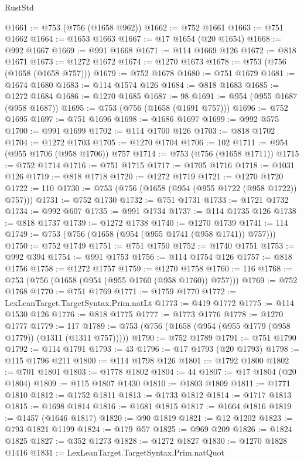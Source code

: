 \begin{lexlean}{RustStd}
\begin{coremodule}
{\begin{coremodule}
{{{{{{{{{{{{{{{{{{{{{{{{{{{{{{{{{{{{{{{{{{{{{{{{{{@1661 := @753 (@756 (@1658 @962))
@1662 := @752 @1661
@1663 := @751 @1662
@1664 := @1653 @1663
@1667 := @17 @1654 (@20 @1654)
@1668 := @992 @1667
@1669 := @991 @1668
@1671 := @114 @1669 @126
@1672 := @818 @1671
@1673 := @1272 @1672
@1674 := @1270 @1673
@1678 := @753 (@756 (@1658 (@1658 @757)))
@1679 := @752 @1678
@1680 := @751 @1679
@1681 := @1674 @1680
@1683 := @114 @1574 @126
@1684 := @818 @1683
@1685 := @1272 @1684
@1686 := @1270 @1685
@1687 := 98
@1691 := @954 (@955 @1687 (@958 @1687))
@1695 := @753 (@756 (@1658 (@1691 @757)))
@1696 := @752 @1695
@1697 := @751 @1696
@1698 := @1686 @1697
@1699 := @992 @575
@1700 := @991 @1699
@1702 := @114 @1700 @126
@1703 := @818 @1702
@1704 := @1272 @1703
@1705 := @1270 @1704
@1706 := 102
@1711 := @954 (@955 @1706 (@958 @1706)) @757
@1714 := @753 (@756 (@1658 @1711))
@1715 := @752 @1714
@1716 := @751 @1715
@1717 := @1705 @1716
@1718 := @1031 @126
@1719 := @818 @1718
@1720 := @1272 @1719
@1721 := @1270 @1720
@1722 := 110
@1730 := @753 (@756 (@1658 (@954 (@955 @1722 (@958 @1722)) @757)))
@1731 := @752 @1730
@1732 := @751 @1731
@1733 := @1721 @1732
@1734 := @992 @607
@1735 := @991 @1734
@1737 := @114 @1735 @126
@1738 := @818 @1737
@1739 := @1272 @1738
@1740 := @1270 @1739
@1741 := 114
@1749 := @753 (@756 (@1658 (@954 (@955 @1741 (@958 @1741)) @757)))
@1750 := @752 @1749
@1751 := @751 @1750
@1752 := @1740 @1751
@1753 := @992 @394
@1754 := @991 @1753
@1756 := @114 @1754 @126
@1757 := @818 @1756
@1758 := @1272 @1757
@1759 := @1270 @1758
@1760 := 116
@1768 := @753 (@756 (@1658 (@954 (@955 @1760 (@958 @1760)) @757)))
@1769 := @752 @1768
@1770 := @751 @1769
@1771 := @1759 @1770
@1772 := LexLeanTarget.TargetSyntax.Prim.natLt
@1773 := @419 @1772
@1775 := @114 @1530 @126
@1776 := @818 @1775
@1777 := @1773 @1776
@1778 := @1270 @1777
@1779 := 117
@1789 := @753 (@756 (@1658 (@954 (@955 @1779 (@958 @1779)) (@1311 (@1311 @757)))))
@1790 := @752 @1789
@1791 := @751 @1790
@1792 := @114 @1791
@1793 := 43
@1796 := @17 @1793 (@20 @1793)
@1798 := @115 @1796 @211
@1800 := @114 @1798 @126
@1801 := @1792 @1800
@1802 := @701 @1801
@1803 := @1778 @1802
@1804 := 44
@1807 := @17 @1804 (@20 @1804)
@1809 := @115 @1807 @1430
@1810 := @1803 @1809
@1811 := @1771 @1810
@1812 := @1752 @1811
@1813 := @1733 @1812
@1814 := @1717 @1813
@1815 := @1698 @1814
@1816 := @1681 @1815
@1817 := @1664 @1816
@1819 := @1457 (@1646 @1817)
@1820 := @90 @1819
@1821 := @12 @1202
@1823 := @793 @1821 @1199
@1824 := @179 @57
@1825 := @969 @209
@1826 := @1824 @1825
@1827 := @352 @1273
@1828 := @1272 @1827
@1830 := @1270 @1828 @1416
@1831 := LexLeanTarget.TargetSyntax.Prim.natQuot
}}}}}}}}}}}}}}}}}}}}}}}}}}}}}}}}}}}}}}}}}}}}}}}}}}
\end{coremodule}}
\end{coremodule}
\end{lexlean}
